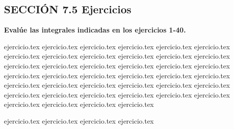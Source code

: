 
\subsection*{SECCIÓN 7.5 \quad Ejercicios}

\noindent\textbf{Evalúe las integrales indicadas en los ejercicios 1-40.}
\begin{enumerate}
    {ejercicio.tex}
{ejercicio.tex}
{ejercicio.tex}
{ejercicio.tex}
{ejercicio.tex}
{ejercicio.tex}
{ejercicio.tex}
{ejercicio.tex}
{ejercicio.tex}
{ejercicio.tex}
{ejercicio.tex}
{ejercicio.tex}
{ejercicio.tex}
{ejercicio.tex}
{ejercicio.tex}
{ejercicio.tex}
{ejercicio.tex}
{ejercicio.tex}
{ejercicio.tex}
{ejercicio.tex}
{ejercicio.tex}
{ejercicio.tex}
{ejercicio.tex}
{ejercicio.tex}
{ejercicio.tex}
{ejercicio.tex}
{ejercicio.tex}
{ejercicio.tex}
{ejercicio.tex}
{ejercicio.tex}
{ejercicio.tex}
{ejercicio.tex}
{ejercicio.tex}
{ejercicio.tex}
{ejercicio.tex}
{ejercicio.tex}
{ejercicio.tex}
{ejercicio.tex}
{ejercicio.tex}
{ejercicio.tex}
\end{enumerate}

\vspace{0.5cm}
\begin{enumerate}
    \setcounter{enumi}{40}
    {ejercicio.tex}
{ejercicio.tex}
{ejercicio.tex}
{ejercicio.tex}
\end{enumerate}
